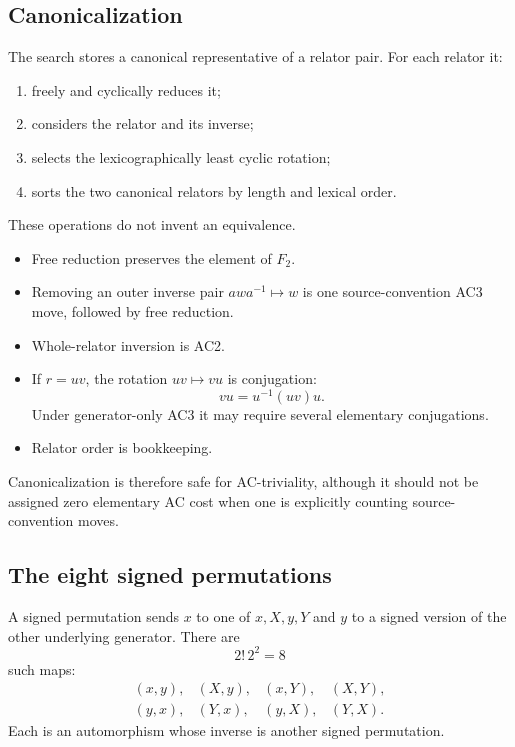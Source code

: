 \documentclass[11pt]{article}
\theoremstyle{definition}
\theoremstyle{remark}
\newcommand{\F}{F_2}
\begin{document}
\subsection{Canonicalization}

The search stores a canonical representative of a relator pair.  For each
relator it:
\begin{enumerate}
  \item freely and cyclically reduces it;
  \item considers the relator and its inverse;
  \item selects the lexicographically least cyclic rotation;
  \item sorts the two canonical relators by length and lexical order.
\end{enumerate}

These operations do not invent an equivalence.

\begin{itemize}
  \item Free reduction preserves the element of \(\F\).
  \item Removing an outer inverse pair \(a w a^{-1}\mapsto w\) is one
  source-convention AC3 move, followed by free reduction.
  \item Whole-relator inversion is AC2.
  \item If \(r=uv\), the rotation \(uv\mapsto vu\) is conjugation:
  \[
    vu=u^{-1}(uv)u.
  \]
  Under generator-only AC3 it may require several elementary conjugations.
  \item Relator order is bookkeeping.
\end{itemize}

Canonicalization is therefore safe for AC-triviality, although it should
not be assigned zero elementary AC cost when one is explicitly counting
source-convention moves.

\subsection{The eight signed permutations}

A signed permutation sends \(x\) to one of \(x,X,y,Y\) and \(y\) to a
signed version of the other underlying generator.  There are
\[
  2!\,2^2=8
\]
such maps:
\[
\begin{array}{llll}
(x,y),&(X,y),&(x,Y),&(X,Y),\\
(y,x),&(Y,x),&(y,X),&(Y,X).
\end{array}
\]
Each is an automorphism whose inverse is another signed permutation.
\end{document}
